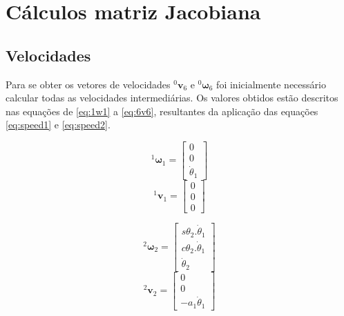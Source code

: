
\chapter{Cálculos matriz Jacobiana}
\label{AnexoJacobiana}

\section{Velocidades}
\label{AnexoJacobiana-velocidades}

Para se obter os vetores de velocidades $^0\textbf{v}_6$ e $^0\boldsymbol{\omega}_6$ foi inicialmente necessário 
calcular todas as velocidades intermediárias. Os valores obtidos estão descritos nas equações
de \ref{eq:1w1} a \ref{eq:6v6}, resultantes da aplicação das equações \ref{eq:speed1} e \ref{eq:speed2}.

\begin{multicols}{2}
    \noindent
    \begin{equation}
        \label{eq:1w1}
        ^1\boldsymbol{\omega}_1 =    \begin{bmatrix}
                            0 \\ 0 \\ \dot{\theta}_1
                        \end{bmatrix}
    \end{equation}
    \begin{equation}
        ^1\textbf{v}_1 =     \begin{bmatrix}
                        0 \\ 0 \\ 0
                    \end{bmatrix}
    \end{equation}
\end{multicols}

\begin{multicols}{2}
    \noindent
    \begin{equation}
        ^2\boldsymbol{\omega}_2 =    \begin{bmatrix}
                            s\theta_2.\dot{\theta}_1 \\ c\theta_2.\dot{\theta}_1 \\ \dot{\theta}_2
                        \end{bmatrix}
    \end{equation}
    \begin{equation}
        ^2\textbf{v}_2 = \begin{bmatrix}
                    0 \\ 0 \\ -a_1\dot{\theta}_1
                \end{bmatrix}
    \end{equation}
\end{multicols}

